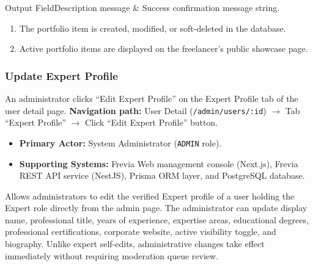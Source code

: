 \begin{specdatatable}{Output Field}{Description}
message & Success confirmation message string.\\ \hline
\end{specdatatable}

\begin{enumerate}[leftmargin=1.6em,topsep=3pt,itemsep=2pt,parsep=0pt]
    \item The portfolio item is created, modified, or soft-deleted in the database.
    \item Active portfolio items are displayed on the freelancer's public showcase page.
\end{enumerate}

\subsubsection{ Update Expert Profile}

An administrator clicks ``Edit Expert Profile'' on the Expert Profile tab of the user detail page.\newline
\textbf{Navigation path:} User Detail (\texttt{/admin/users/:id}) $\rightarrow$ Tab ``Expert Profile'' $\rightarrow$ Click ``Edit Expert Profile'' button.


\begin{itemize}[leftmargin=1.6em,topsep=3pt,itemsep=2pt,parsep=0pt,label=$\bullet$]
    \item \textbf{Primary Actor:} System Administrator (\texttt{ADMIN} role).
    \item \textbf{Supporting Systems:} Frevia Web management console (Next.js), Frevia REST API service (NestJS), Prisma ORM layer, and PostgreSQL database.
\end{itemize}

\noindent Allows administrators to edit the verified Expert profile of a user holding the Expert role directly from the admin page. The administrator can update display name, professional title, years of experience, expertise areas, educational degrees, professional certifications, corporate website, active visibility toggle, and biography. Unlike expert self-edits, administrative changes take effect immediately without requiring moderation queue review.

